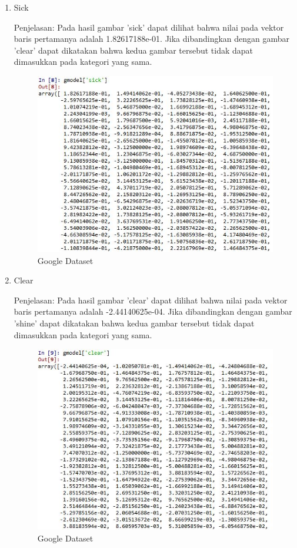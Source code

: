 \begin{enumerate}
\begin{enumerate}
\item Sick

Penjelasan: Pada hasil gambar 'sick' dapat dilihat bahwa nilai pada vektor baris pertamanya adalah 1.82617188e-01. Jika dibandingkan dengan gambar 'clear' dapat dikatakan bahwa kedua gambar tersebut tidak dapat dimasukkan pada kategori yang sama.

\begin{figure}[H]
\centering
\includegraphics[scale=0.7]{figures/1174051/5/15sick.jpg}
\caption{Google Dataset}
\label{Google Dataset}
\end{figure}

\item Clear

Penjelasan: Pada hasil gambar 'clear' dapat dilihat bahwa nilai pada vektor baris pertamanya adalah -2.44140625e-04. Jika dibandingkan dengan gambar 'shine' dapat dikatakan bahwa kedua gambar tersebut tidak dapat dimasukkan pada kategori yang sama.

\begin{figure}[H]
\centering
\includegraphics[scale=0.7]{figures/1174051/5/16clear.jpg}
\caption{Google Dataset}
\label{Google Dataset}
\end{figure}


\end{enumerate}
\end{enumerate}
